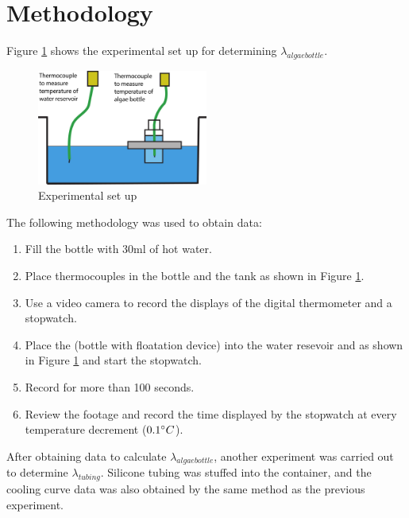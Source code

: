 \documentclass[10pt,a4paper]{IEEEtran}
\begin{document}
	\section{Methodology}
	Figure \ref{fig:methodology} shows the experimental set up for determining $\lambda_{algae bottle}$.
 	\begin{figure}[H]
 		\begin{center}
 			\includegraphics[width=0.5\textwidth]{methodology.png}
 			\caption{Experimental set up}
 			\label{fig:methodology}
 		\end{center}
 	\end{figure} 
	The following methodology was used to obtain data:
	\begin{enumerate}
		\item Fill the bottle with 30ml of hot water.
		\item Place thermocouples in the bottle and the tank as shown in Figure \ref{fig:methodology}.
		\item Use a video camera to record the displays of the digital thermometer and a stopwatch.
		\item Place the (bottle with floatation device) into the water resevoir and as shown in Figure \ref{fig:methodology} and start the stopwatch.
		\item Record for more than 100 seconds.
		\item Review the footage and record the time displayed by the stopwatch at every temperature decrement ($0.1 \degree C$).
	\end{enumerate}
	After obtaining data to calculate $\lambda_{algae bottle}$, another experiment was carried out to determine $\lambda_{tubing}$. Silicone tubing was stuffed into the container, and the cooling curve data was also obtained by the same method as the previous experiment.
\end{document}
